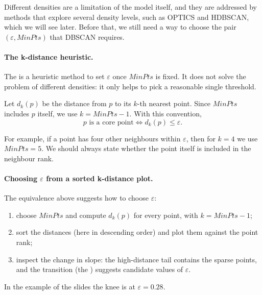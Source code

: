 Different densities are a limitation of the model itself, and they are addressed by methods that explore several density levels, such as OPTICS and HDBSCAN, which we will see later. Before that, we still need a way to choose the  pair $(\varepsilon, MinPts)$ that DBSCAN requires.

\paragraph{The k-distance heuristic.} The  is a heuristic method to set $\varepsilon$ once $MinPts$ is fixed. It does not solve the problem of different densities: it only helps to pick a reasonable single threshold.

\begin{definition}[k-distance]
Let $d_k(p)$ be the distance from $p$ to its $k$-th nearest  point. Since $MinPts$ includes $p$ itself, we use $k = MinPts - 1$. With this convention,
\[
p \text{ is a core point} \iff d_k(p) \le \varepsilon.
\]
\end{definition}
For example, if a point has four other neighbours within $\varepsilon$, then for $k = 4$ we use $MinPts = 5$. We should always state whether the point itself is included in the neighbour rank.

\paragraph{Choosing $\varepsilon$ from a sorted k-distance plot.} The equivalence above suggests how to choose $\varepsilon$:
\begin{enumerate}
  \item choose $MinPts$ and compute $d_k(p)$ for every point, with $k = MinPts - 1$;
  \item sort the distances (here in descending order) and plot them against the point rank;
  \item inspect the change in slope: the high-distance tail contains the sparse points, and the transition (the ) suggests candidate values of $\varepsilon$.
\end{enumerate}
In the example of the slides the knee is at $\varepsilon = 0.28$.

